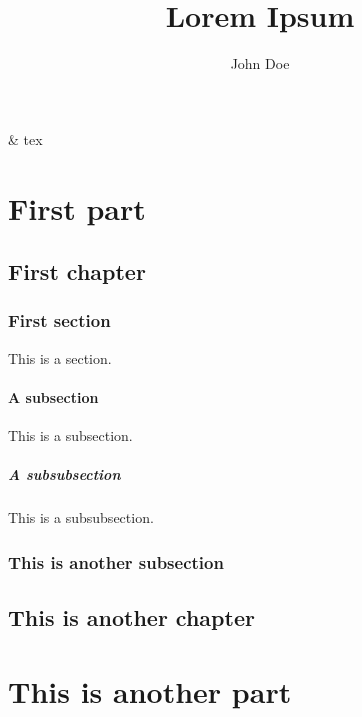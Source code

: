 & tex

\newcommand*{\abs}[1]{\left|#1\right|}

\title{Lorem Ipsum}
\author{John Doe}



\part{First part}

\chapter{First chapter}

\section{First section}

This is a section.

\subsection{A subsection}

This is a subsection.

\subsubsection{A subsubsection}

This is a subsubsection.

\section{This is another subsection}

\chapter{This is another chapter}

\part{This is another part}



